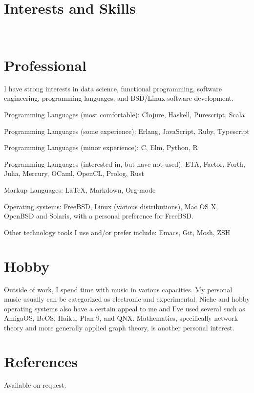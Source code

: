 \documentclass[margintitle,line]{res}
\renewcommand{\subsection}[1]{\section{\normalfont #1}}
\begin{document}
\begin{resume}

\section{Interests and Skills}
\ \\
\subsection{Professional}

I have strong interests in data science, functional programming,
software engineering, programming languages, and BSD/Linux software development.

Programming Languages (most comfortable): Clojure, Haskell, Purescript, Scala

Programming Languages (some experience): Erlang, JavaScript, Ruby, Typescript

Programming Languages (minor experience): C, Elm, Python, R

Programming Languages (interested in, but have not used): ETA, Factor, Forth, Julia, Mercury,
OCaml, OpenCL, Prolog, Rust

Markup Languages: LaTeX, Markdown, Org-mode

Operating systems: FreeBSD, Linux (various distributions), Mac OS X, OpenBSD and
Solaris, with a personal preference for FreeBSD.

Other technology tools I use and/or prefer include: Emacs, Git, Mosh, ZSH
\subsection{Hobby}

Outside of work, I spend time with music in various
capacities. My personal music usually can be categorized as electronic
and experimental. Niche and hobby operating systems also have a certain appeal
to me and I've used several such as AmigaOS, BeOS, Haiku, Plan 9, and QNX.
Mathematics, specifically network theory and more generally applied graph
theory, is another personal interest.

\section{References}

Available on request.

\end{resume}
\end{document}
